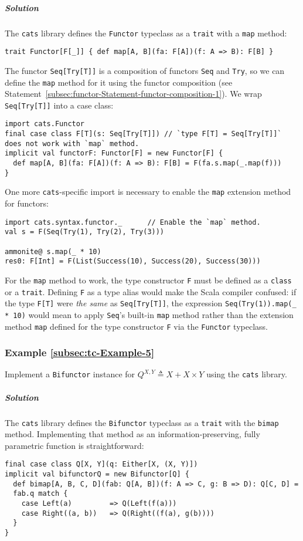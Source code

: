 \subparagraph{Solution}

The \texttt{cats} library defines the \lstinline!Functor! typeclass
as a \lstinline!trait! with a \lstinline!map! method:
\begin{lstlisting}
trait Functor[F[_]] { def map[A, B](fa: F[A])(f: A => B): F[B] }
\end{lstlisting}
The functor \lstinline!Seq[Try[T]]! is a composition of functors
\lstinline!Seq! and \lstinline!Try!, so we can define the \lstinline!map!
method for it using the functor composition (see Statement~\ref{subsec:functor-Statement-functor-composition-1}).
We wrap \lstinline!Seq[Try[T]]! into a case class:
\begin{lstlisting}
import cats.Functor
final case class F[T](s: Seq[Try[T]]) // `type F[T] = Seq[Try[T]]` does not work with `map` method.
implicit val functorF: Functor[F] = new Functor[F] {
  def map[A, B](fa: F[A])(f: A => B): F[B] = F(fa.s.map(_.map(f)))
}
\end{lstlisting}
One more \texttt{cats}-specific import is necessary to enable the
\lstinline!map! extension method for functors:
\begin{lstlisting}
import cats.syntax.functor._      // Enable the `map` method.
val s = F(Seq(Try(1), Try(2), Try(3)))

ammonite@ s.map(_ * 10)
res0: F[Int] = F(List(Success(10), Success(20), Success(30)))
\end{lstlisting}
For the \lstinline!map! method to work, the type constructor \lstinline!F!
must be defined as a \lstinline!class! or a \lstinline!trait!. Defining
\lstinline!F! as a type alias would make the Scala compiler confused:
if the type \lstinline!F[T]! were \emph{the same} as \lstinline!Seq[Try[T]]!,
the expression \lstinline!Seq(Try(1)).map(_ * 10)! would mean to
apply \lstinline!Seq!\textsf{'}s built-in \lstinline!map! method rather than
the extension method \lstinline!map! defined for the type constructor
\lstinline!F! via the \lstinline!Functor! typeclass.

\subsubsection{Example \label{subsec:tc-Example-5}\ref{subsec:tc-Example-5}}

Implement a \lstinline!Bifunctor! instance for $Q^{X,Y}\triangleq X+X\times Y$
using the \texttt{cats} library.

\subparagraph{Solution}

The \texttt{cats} library defines the \lstinline!Bifunctor! typeclass
as a \lstinline!trait! with the \lstinline!bimap! method. Implementing
that method as an information-preserving, fully parametric function
is straightforward:
\begin{lstlisting}
final case class Q[X, Y](q: Either[X, (X, Y)])
implicit val bifunctorQ = new Bifunctor[Q] {
  def bimap[A, B, C, D](fab: Q[A, B])(f: A => C, g: B => D): Q[C, D] =
  fab.q match {
    case Left(a)         => Q(Left(f(a)))
    case Right((a, b))   => Q(Right((f(a), g(b))))
  }
}
\end{lstlisting}


